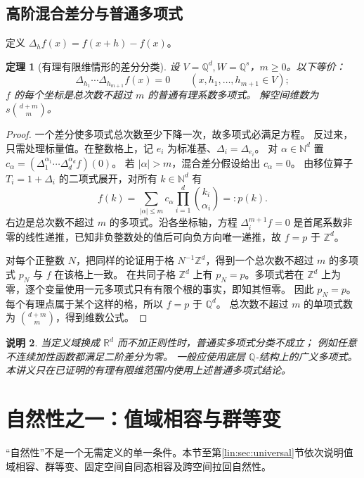 \documentclass[11pt,a4paper,oneside,openany]{book}
\theoremstyle{lecture}
\newtheorem{theorem}{定理}[section]
\newtheorem{remark}[theorem]{说明}
\newcommand{\Q}{\mathbb Q}
\newcommand{\R}{\mathbb R}
\newcommand{\Z}{\mathbb Z}
\newcommand{\N}{\mathbb N}
\numberwithin{equation}{section}
\begin{document}
\subsection{高阶混合差分与普通多项式}
定义 $\Delta_hf(x)=f(x+h)-f(x)$。
\begin{theorem}[有理有限维情形的差分分类]\label{lin:thm:polydifference}
设 $V=\Q^d,W=\Q^s$，$m\ge0$。以下等价：
\[
 \Delta_{h_1}\cdots\Delta_{h_{m+1}}f(x)=0
 \qquad(x,h_1,\ldots,h_{m+1}\in V);
\]
$f$ 的每个坐标是总次数不超过 $m$ 的普通有理系数多项式。
解空间维数为 $s\binom{d+m}{m}$。
\end{theorem}
\begin{proof}
一个差分使多项式总次数至少下降一次，故多项式必满足方程。
反过来，只需处理标量值。在整数格上，记 $e_i$ 为标准基、$\Delta_i=\Delta_{e_i}$。
对 $\alpha\in\N^d$ 置 $c_\alpha=(\Delta_1^{\alpha_1}\cdots\Delta_d^{\alpha_d}f)(0)$。
若 $|\alpha|>m$，混合差分假设给出 $c_\alpha=0$。
由移位算子 $T_i=1+\Delta_i$ 的二项式展开，对所有 $k\in\N^d$ 有
\[
 f(k)=\sum_{|\alpha|\le m}c_\alpha
       \prod_{i=1}^d\binom{k_i}{\alpha_i}=:p(k).
\]
右边是总次数不超过 $m$ 的多项式。沿各坐标轴，方程 $\Delta_i^{m+1}f=0$ 是首尾系数非零的线性递推，已知非负整数处的值后可向负方向唯一递推，故 $f=p$ 于 $\Z^d$。

对每个正整数 $N$，把同样的论证用于格 $N^{-1}\Z^d$，得到一个总次数不超过 $m$ 的多项式 $p_N$ 与 $f$ 在该格上一致。
在共同子格 $\Z^d$ 上有 $p_N=p$。多项式若在 $\Z^d$ 上为零，逐个变量使用一元多项式只有有限个根的事实，即知其恒零。
因此 $p_N=p$。每个有理点属于某个这样的格，所以 $f=p$ 于 $\Q^d$。
总次数不超过 $m$ 的单项式数为 $\binom{d+m}{m}$，得到维数公式。
\end{proof}
\begin{remark}
当定义域换成 $\R^d$ 而不加正则性时，普通实多项式分类不成立；
例如任意不连续加性函数都满足二阶差分为零。
一般应使用底层 $\Q$-结构上的广义多项式。本讲义只在已证明的有理有限维范围内使用上述普通多项式结论。
\end{remark}

\section{自然性之一：值域相容与群等变}\label{lin:sec:natural}
“自然性”不是一个无需定义的单一条件。本节至第\ref{lin:sec:universal}节依次说明值域相容、群等变、固定空间自同态相容及跨空间拉回自然性。
\end{document}
